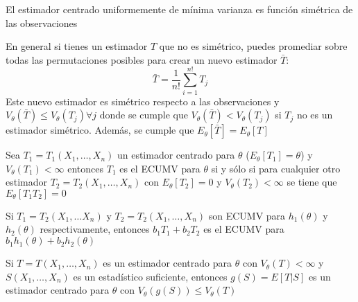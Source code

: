 \begin{teorema}
  El estimador centrado uniformemente de mínima varianza es función simétrica de las observaciones
\end{teorema}


\begin{observación}
  En general si tienes un estimador $T$ que no es simétrico, puedes promediar sobre todas las permutaciones posibles para crear un nuevo estimador $\bar{T}$: 
  $$\bar{T} = \frac{1}{n!}\sum_{i = 1}^{n!} T_j$$
  Este nuevo estimador es simétrico respecto a las observaciones y $V_{\theta}(\bar{T}) \leq V_{\theta}(T_j) \forall j$ donde se cumple que $V_{\theta}(\bar{T}) < V_{\theta}(T_j)$ si $T_j$ no es un estimador simétrico. Además, se cumple que $E_{\theta}[\bar{T}] = E_{\theta}[T]$	
\end{observación}

\begin{teorema}
  Sea $T_1 = T_1(X_1, \ldots, X_n)$ un estimador centrado para $\theta$ ($E_{\theta}[T_1] = \theta$) y $V_{\theta}(T_1) < \infty$ entonces $T_1$ es el ECUMV para $\theta$ si y sólo si para cualquier otro estimador $T_2 = T_2(X_1, \ldots, X_n)$ con $E_{\theta}[T_2] = 0$ y $V_{\theta}(T_2) < \infty$ se tiene que $E_{\theta}[T_1T_2] = 0$
\end{teorema}

\begin{corolario}
  Si $T_1 = T_2(X_1, \ldots X_n)$ y $T_2 = T_2(X_1, \ldots, X_n)$ son ECUMV para $h_1(\theta)$ y $h_2(\theta)$ respectivamente, entonces $b_1T_1 + b_2T_2$ es el ECUMV para $b_1h_1(\theta) + b_2h_2(\theta)$
\end{corolario}

\begin{teorema}
  Si $T = T(X_1, \ldots, X_n)$ es un estimador centrado para $\theta$ con $V_{\theta}(T) < \infty$ y $S(X_1, \ldots, X_n)$ es un estadístico suficiente, entonces $g(S) = E[T | S]$ es un estimador centrado para $\theta$ con $V_{\theta}(g(S)) \leq V_{\theta}(T)$
\end{teorema}

